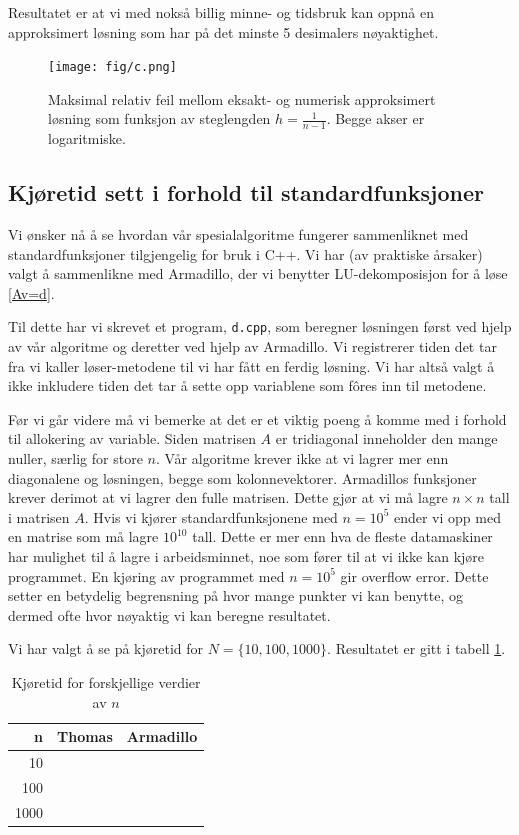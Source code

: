 \documentclass[11pt]{article}
\begin{document}
Resultatet er at vi med nokså billig minne- og tidsbruk kan oppnå en
approksimert løsning som har på det minste 5 desimalers
nøyaktighet. 

\begin{figure}[ht]
  \centering
  \texttt{[image: fig/c.png]}
  \caption{\label{fig:c} Maksimal relativ feil mellom eksakt-
    og numerisk approksimert løsning som funksjon av steglengden $h =
    \frac{ 1 }{ n-1 }$. Begge akser er logaritmiske.}
\end{figure}


\subsection{Kjøretid sett i forhold til standardfunksjoner}
Vi ønsker nå å se hvordan vår spesialalgoritme fungerer sammenliknet
med standardfunksjoner tilgjengelig for bruk i C++. Vi har (av
praktiske årsaker) valgt å sammenlikne med Armadillo, der vi benytter
LU-dekomposisjon for å løse \eqref{Av=d}. 

Til dette har vi skrevet et program, \texttt{d.cpp}, som beregner
løsningen først ved hjelp av vår algoritme og deretter ved hjelp av
Armadillo. Vi registrerer tiden det tar fra vi kaller løser-metodene
til vi har fått en ferdig løsning. Vi har altså valgt å ikke inkludere
tiden det tar å sette opp variablene som fôres inn til metodene. 

Før vi går videre må vi bemerke at det er et viktig poeng å komme med
i forhold til allokering av variable. Siden matrisen $A$ er
tridiagonal inneholder den mange nuller, særlig for store $n$. Vår
algoritme krever ikke at vi lagrer mer enn diagonalene og løsningen,
begge som kolonnevektorer. Armadillos funksjoner krever derimot at vi
lagrer den fulle matrisen. Dette gjør at vi må lagre $n\times n$ tall
i matrisen $A$. Hvis vi kjører standardfunksjonene med $n=10^5$ ender
vi opp med en matrise som må lagre $10^{10}$ tall. Dette er mer enn
hva de fleste datamaskiner har mulighet til å lagre i arbeidsminnet,
noe som fører til at vi ikke kan kjøre programmet. En kjøring av programmet med
$n=10^5$ gir overflow error. Dette setter en
betydelig begrensning på hvor mange punkter vi kan benytte, og dermed
ofte hvor nøyaktig vi kan beregne resultatet.

Vi har valgt å se på kjøretid for $N = \{10, 100, 1000\}$. Resultatet
er gitt i tabell \ref{tab:1}.
\begin{table}[h]
\centering
\caption{Kjøretid for forskjellige verdier av $n$}
\label{tab:1}
\vspace{0.1cm}
\begin{tabular}{rll}
n & Thomas & Armadillo \\
\hline
10 &  &  \\
100 &  &  \\
1000 &  &  \\
\end{tabular}
\end{table}
\end{document}
